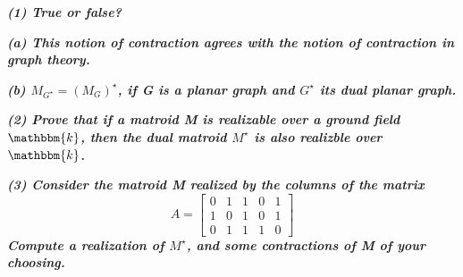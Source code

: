 \textbf{\textit{(1) True or false?}}

\vspace{3pt}

\hspace{5pt} \textbf{\textit{(a) This notion of contraction agrees with the notion of contraction in graph theory.}}

\vspace{3pt}


\begin{figure}[h!]
    \centering
\end{figure}

\hspace{5pt} \textbf{\textit{(b) $M_{G^\star} = \left(M_G\right)^\star$, if G is a planar graph and $G^\star$ its dual planar graph.}}

\vspace{10pt}

\textbf{\textit{(2) Prove that if a matroid M is realizable over a ground field $\mathbbm{k}$, then the dual matroid $M^\star$ is also realizble over $\mathbbm{k}$.}}

\vspace{10pt}

\textbf{\textit{(3) Consider the matroid M realized by the columns of the matrix}}
$$
A = \left[
    \begin{array}{ccccc}
        0 & 1 & 1 & 0 & 1 \\
        1 & 0 & 1 & 0 & 1 \\
        0 & 1 & 1 & 1 & 0
    \end{array}
\right]
$$
\textbf{\textit{ Compute a realization of $M^\star$, and some contractions of M of your choosing.}}

\vspace{5pt}

